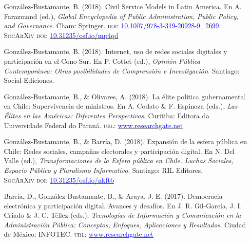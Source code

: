 \begin{publications}

\begin{benumerate}{12}
\item{\small Gonz\'alez-Bustamante, B. (2018). Civil Service Models in Latin America. En A. Farazmand (ed.), {\itshape Global Encyclopedia of Public Administration, Public Policy, and Governance}. Cham: Springer. {\scshape doi}: \href{https://doi.org/10.1007/978-3-319-20928-9\_2699}{\textcolor{blue}{10.1007/978-3-319-20928-9\_2699}}. {\scshape {\footnotesize SocArXiv} doi}: \href{https://doi.org/10.31235/osf.io/mp4qd}{\textcolor{blue}{10.31235/osf.io/mp4qd}}}\vspace{1mm}

\item{\small Gonz\'alez-Bustamante, B. (2018). Internet, uso de redes sociales digitales y participación en el Cono Sur. En P. Cottet (ed.), {\itshape Opini\'on P\'ublica Contempor\'anea: Otras posibilidades de Comprensi\'on e Investigaci\'on}. Santiago: Social-Ediciones.}\vspace{1mm}

\item{\small Gonz\'alez-Bustamante, B., \& Olivares, A. (2018). La élite política gubernamental en Chile: Supervivencia de ministros. En A. Codato \& F. Espinoza (eds.), {\itshape Las \'Elites en las Am\'ericas: Diferentes Perspectivas}. Curitiba: Editora da Universidade Federal do Paraná. {\scshape url}: \href{https://www.researchgate.net/publication/325699783_Elites_en_las_Americas_diferentes_perspectivas_Elites_in_the_Americas_Different_Perspectives}{\textcolor{blue}{www.researchgate.net}}} \vspace{1mm}

\item{\small Gonz\'alez-Bustamante, B., \& Barr\'ia, D. (2018). Expansión de la esfera pública en Chile: Redes sociales, campañas electorales y participación digital. En N. Del Valle (ed.), {\itshape Transformaciones de la Esfera p\'ublica en Chile. Luchas Sociales, Espacio P\'ublico y Pluralismo Informativo}. Santiago: RIL Editores. \\ {\scshape {\footnotesize SocArXiv} doi}: \href{https://doi.org/10.31235/osf.io/nkftb}{\textcolor{blue}{10.31235/osf.io/nkftb}}}\vspace{1mm}

\item{\small Barr\'ia, D., Gonz\'alez-Bustamante, B., \& Araya, J. E. (2017). Democracia electrónica y participación digital. Avances y desafíos. En J. R. Gil-Garc\'ia, J. I. Criado \&  J. C. T\'ellez (eds.), {\itshape Tecnolog\'ias de Informaci\'on y Comunicaci\'on en la Administraci\'on P\'ublica: Conceptos, Enfoques, Aplicaciones y Resultados}. Ciudad de México: INFOTEC. {\scshape url}: \href{https://www.researchgate.net/publication/321980289_Democracia_electronica_y_participacion_digital_Avances_y_desafios}{\textcolor{blue}{www.researchgate.net}}} \vspace{1mm}


\end{benumerate}
\end{publications}
